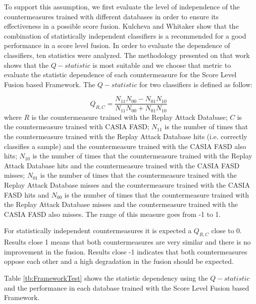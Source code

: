 To support this assumption, we first evaluate the level of independence of the countermeasures trained with different databases in order to ensure its effectiveness in a possible score fusion. Kulcheva and Whitaker \cite{kuncheva2003measures} show that the combination of statistically independent classifiers is a recommended for a good performance in a score level fusion. In order to evaluate the dependence of classifiers, ten statistics were analyzed. The methodology presented on that work shows that the $Q-statistic$ is most suitable and we choose that metric to evaluate the statistic dependence of each countermeasure for the Score Level Fusion based Framework. The $Q-statistic$ for two classifiers is defined as follow:

\begin{equation}
\label{eq:Qstatistic}
Q_{R,C} = \frac{N_{11}N_{00} - N_{01}N_{10}}{N_{11}N_{00} +N_{01}N_{10}}
\end{equation}
where $R$ is the countermeasure trained with the Replay Attack Database; $C$ is the countermeasure trained with CASIA FASD; $N_{11}$ is the number of times that the countermeasure trained with the Replay Attack Database hits (i.e. correctly classifies a sample) and the countermeasure trained with the CASIA FASD also hits; $N_{10}$ is the number of times that the countermeasure trained with the Replay Attack Database hits and the countermeasure trained with the CASIA FASD misses; $N_{01}$ is the number of times that the countermeasure trained with the Replay Attack Database misses and the countermeasure trained with the CASIA FASD hits and $N_{00}$ is the number of times that the countermeasure trained with the Replay Attack Database misses and the countermeasure trained with the CASIA FASD also misses. The range of this measure goes from -1 to 1.

For statistically independent countermeasures it is expected a $Q_{R,C}$ close to 0. Results close 1 means that both countermeasures are very similar and there is no improvement in the fusion. Results close -1 indicates that both countermeasures oppose each other and a high degradation in the fusion should be expected. 

Table \ref{tb:FrameworkTest} shows the statistic dependency using the $Q-statistic$ and the performance in each database trained with the Score Level Fusion based Framework. %

